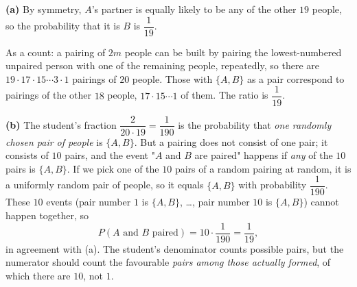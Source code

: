 \textbf{(a)} By symmetry, $A$'s partner is equally likely to be any of the other $19$ people, so the probability that it is $B$ is $\boxed{\dfrac{1}{19}}$.

As a count: a pairing of $2m$ people can be built by pairing the lowest-numbered unpaired person with one of the remaining people, repeatedly, so there are $19\cdot17\cdot15\cdots3\cdot1$ pairings of $20$ people. Those with $\{A,B\}$ as a pair correspond to pairings of the other $18$ people, $17\cdot15\cdots1$ of them. The ratio is $\dfrac{1}{19}$.

\textbf{(b)} The student's fraction $\dfrac{2}{20\cdot19}=\dfrac{1}{190}$ is the probability that \emph{one randomly chosen pair of people} is $\{A,B\}$. But a pairing does not consist of one pair; it consists of $10$ pairs, and the event "$A$ and $B$ are paired" happens if \emph{any} of the $10$ pairs is $\{A,B\}$. If we pick one of the $10$ pairs of a random pairing at random, it is a uniformly random pair of people, so it equals $\{A,B\}$ with probability $\dfrac{1}{190}$. These $10$ events (pair number $1$ is $\{A,B\}$, \dots, pair number $10$ is $\{A,B\}$) cannot happen together, so
\[
P(A\text{ and }B\text{ paired})=10\cdot\dfrac{1}{190}=\dfrac{1}{19},
\]
in agreement with (a). The student's denominator counts possible pairs, but the numerator should count the favourable \emph{pairs among those actually formed}, of which there are $10$, not $1$.
